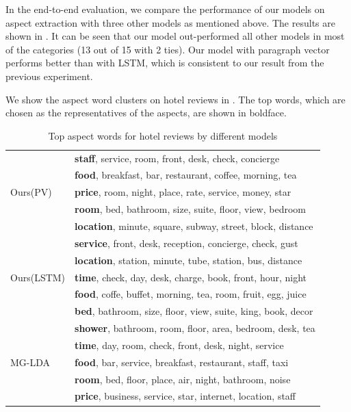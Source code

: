 In the end-to-end evaluation, we compare the performance of our models on aspect extraction with three other models as mentioned above. The results are shown in . It can be seen that our model out-performed all other models in most of the categories (13 out of 15 with 2 ties). 
Our model with paragraph vector performs better than with LSTM, 
which is consistent to our result from the previous experiment.

We show the aspect word clusters on hotel reviews in . The top words, which are chosen as the representatives of the aspects, are shown in boldface. 

\begin{table}[th]
\centering
\caption{Top aspect words for hotel reviews by different models}
\label{table:hotel_aspect_words}
\begin{tabular}{|l|l|} \hline
\multirow{5}{*}{Ours(PV)}
& \textbf{staff}, service, room, front, desk, check, concierge \\
& \textbf{food}, breakfast, bar, restaurant, coffee, morning, tea \\
& \textbf{price}, room, night, place, rate, service, money, star \\
& \textbf{room}, bed, bathroom, size, suite, floor, view, bedroom \\
& \textbf{location}, minute, square, subway, street, block, distance \\\hline

\multirow{5}{*}{Ours(LSTM)}
& \textbf{service}, front, desk, reception, concierge, check, gust \\
& \textbf{location}, station, minute, tube, station, bus, distance \\
& \textbf{time}, check, day, desk, charge, book, front, hour, night \\
& \textbf{food}, coffe, buffet, morning, tea, room, fruit, egg, juice \\
& \textbf{bed}, bathroom, size, floor, view, suite, king, book, decor \\ \hline

\multirow{5}{*}{MG-LDA}
& \textbf{shower}, bathroom, room, floor, area, bedroom, desk, tea \\
& \textbf{time}, day, room, check, front, desk, night, service \\
& \textbf{food}, bar, service, breakfast, restaurant, staff, taxi \\
& \textbf{room}, bed, floor, place, air, night, bathroom, noise \\
& \textbf{price}, business, service, star, internet, location, staff \\\hline


\end{tabular}
\end{table}
